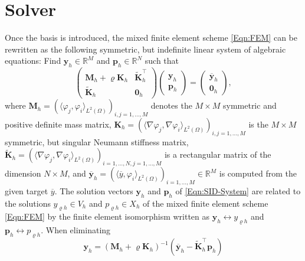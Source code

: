 \documentclass{article}
\numberwithin{equation}{section}
\begin{document}
\section{Solver}
\label{Sec:Solver}
Once the basis is introduced, the mixed finite element scheme \eqref{Eqn:FEM}
can be rewritten as the following symmetric, but indefinite linear system of
algebraic equations: Find  $\mathbf{y}_h \in \mathbb{R}^M$ and
$\mathbf{p}_h \in \mathbb{R}^N$ such that
\begin{equation}\label{Eqn:SID-System}
  \left(
    \begin{array}{cc}
      \mathbf{M}_h + \varrho \mathbf{K}_h & \widetilde{\mathbf{K}}_h^\top \\[1mm]
      \widetilde{\mathbf{K}}_h & \mathbf{0}_h
    \end{array}
  \right)
  \left(
    \begin{array}{c}
      \mathbf{y}_h \\[1mm]
      \mathbf{p}_h
    \end{array}
  \right)
  =
  \left(
    \begin{array}{c}
      \overline{\mathbf{y}}_h \\[1mm]
      \mathbf{0}_h
    \end{array}
  \right),
\end{equation}
where $\mathbf{M}_h = (\langle \varphi_j,\varphi_i \rangle_{L^2(\Omega)}
)_{i,j=1,\ldots,M}$ denotes the $M \times M$ symmetric and positive definite
mass matrix, $\mathbf{K}_h = (\langle \nabla \varphi_j,  \nabla \varphi_i
\rangle_{L^2(\Omega)})_{i,j=1,\ldots,M}$ is the $M \times M$ symmetric, but
singular Neumann stiffness matrix, $\widetilde{\mathbf{K}}_h =
(\langle \nabla\varphi_j,  \nabla \varphi_i \rangle_{L^2(\Omega)}
)_{i=1,\ldots,N,j=1,\ldots,M}$ is a rectangular matrix of the dimension
$N \times M$, and $\overline{\mathbf{y}}_h =
(\langle \overline{y},\varphi_i \rangle_{L^2(\Omega)})_{i=1,\ldots,M} \in
\mathbb{R}^M$ is computed from the given target $\overline{y}$. The solution
vectors $\mathbf{y}_h$ and $\mathbf{p}_h$ of \eqref{Eqn:SID-System} 
are related to the solutions $y_{\varrho h} \in V_h$ and $p_{\varrho h}  \in X_h$ 
of the mixed finite element scheme \eqref{Eqn:FEM} by the finite element
isomorphism written as $\mathbf{y}_h \leftrightarrow y_{\varrho h} $ and
$\mathbf{p}_h \leftrightarrow p_{\varrho h}$. When eliminating 
\begin{equation}\label{Eqn:Elimination}
  \mathbf{y}_h = (\mathbf{M}_h + \varrho \mathbf{K}_h)^{-1}
  (\overline{\mathbf{y}}_h - \widetilde{\mathbf{K}}_h^\top \mathbf{p}_h)
\end{equation}
\end{document}
